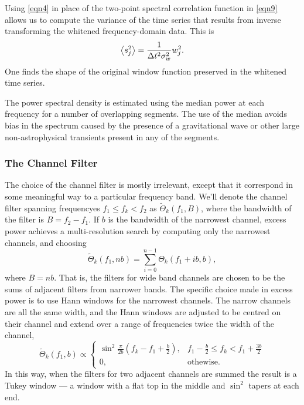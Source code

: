 \documentclass[10pt]{article}
\begin{document}
Using \eqref{eqn4} in place of the two-point spectral correlation function
in \eqref{eqn9} allows us to compute the variance of the time series that
results from inverse transforming the whitened frequency-domain data.  This
is
\begin{equation}
\left\langle s_{j}^{2}\right\rangle
    = \frac{1}{\Delta t^{2} \sigma_{w}^{2}} w_{j}^{2}.
\end{equation}
One finds the shape of the original window function preserved in the
whitened time series.

The power spectral density is estimated using the median power at each
frequency for a number of overlapping segments.  The use of the median
avoids bias in the spectrum caused by the presence of a gravitational wave
or other large non-astrophysical transients present in any of the segments. 


\subsubsection{The Channel Filter}
\label{sec:channelfilter}


The choice of the channel filter is mostly irrelevant, except that it
correspond in some meaningful way to a particular frequency band.  We'll
denote the channel filter spanning frequencyes \(f_{1} \leq f_{k} < f_{2}\)
as \(\tilde{\Theta}_{k}(f_{1}, B)\), where the bandwidth of the filter is
\(B = f_{2} - f_{1}\).  If \(b\) is the bandwidth of the narrowest channel,
excess power achieves a multi-resolution search by computing only the
narrowest channels, and choosing
\begin{equation}
\tilde{\Theta}_{k}(f_{1}, n b)
   = \sum_{i = 0}^{n - 1} \Theta_{k}(f_{1} + i b, b),
\end{equation}
where \(B = n b\).  That is, the filters for wide band channels are chosen
to be the sums of adjacent filters from narrower bands.  The specific
choice made in excess power is to use Hann windows for the narrowest
channels.  The narrow channels are all the same width, and the Hann windows
are adjusted to be centred on their channel and extend over a range of
frequencies twice the width of the channel,
\begin{equation}
\tilde{\Theta}_{k}(f_{1}, b)
   \propto \begin{cases}
   \sin^{2} \frac{\pi}{2 b} (f_{k} - f_{1} + \frac{b}{2}), & f_{1} -
   \frac{b}{2} \leq f_{k} < f_{1} + \frac{3 b}{2} \\
   0, & \text{othewise}.
   \end{cases}
\end{equation}
In this way, when the filters for two adjacent channels are summed the
result is a Tukey window --- a window with a flat top in the middle and
\(\sin^{2}\) tapers at each end.
\end{document}
